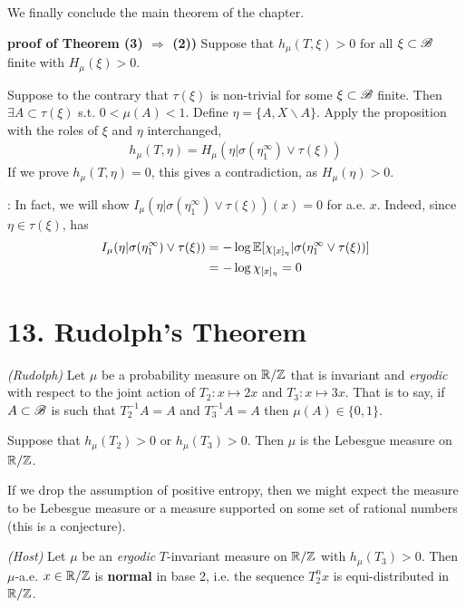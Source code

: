 \documentclass[12pt,a4paper]{report}
\newenvironment{proof}
{\begin{changemargin}{1cm}{0.5cm} 
	}%
	{\end{changemargin}
}
\newenvironment{subproof}
{\begin{changemargin}{0.5cm}{0.5cm}
	}%
	{\end{changemargin}
}
\begin{document}
We finally conclude the main theorem of the chapter.
\s

\begin{proof}
\textbf{proof of Theorem (3) $\Rightarrow$ (2))} Suppose that $h_{\mu}(T, \xi ) >0$ for all $\xi \subset \mathscr{B}$ finite with $H_{\mu}(\xi) >0$. 

\quad Suppose to the contrary that $\tau(\xi)$ is non-trivial for some $\xi \subset \mathscr{B}$ finite. Then $\exists A \subset \tau(\xi)$ s.t. $0< \mu(A) <1$. Define $\eta = \{A, X\backslash A \}$. Apply the proposition with the roles of $\xi$ and $\eta$ interchanged,
\begin{align*}
h_{\mu}(T, \eta) = H_{\mu} (\eta | \sigma(\eta_1^{\infty}) \vee \tau(\xi) ) 
\end{align*}
If we prove $h_{\mu}(T, \eta) =0$, this gives a contradiction, as $H_{\mu}(\eta) >0$.
\begin{subproof}
: In fact, we will show $I_{\mu}(\eta | \sigma(\eta_1^{\infty}) \vee \tau(\xi)) (x) =0$ for a.e. $x$. Indeed, since $\eta \in \tau(\xi)$, has
\begin{align*}
I_{\mu}(\eta | \sigma(\eta_1^{\infty}) \vee \tau(\xi)) &= -\log \mathbb{E} [\chi_{[x]_{\eta}} | \sigma(\eta_1^{\infty} \vee \tau(\xi))] \\
&= -\log \chi_{[x]_{\eta}} =0
\end{align*}
\end{subproof}
\eop
\end{proof}

\section*{13. Rudolph's Theorem}

\thm \emph{(Rudolph)} Let $\mu$ be a probability measure on $\mathbb{R}/ \mathbb{Z}$ that is invariant and \emph{ergodic} with respect to the joint action of $T_2 : x \mapsto 2x$ and $T_3 : x\mapsto 3x$. That is to say, if $A \subset \mathscr{B}$ is such that $T_2^{-1} A =A$ and $T_3^{-1} A =A$ then $\mu(A) \in \{0,1\}$. 

\quad Suppose that $h_{\mu}(T_2)>0$ or $h_{\mu}(T_3) >0$. Then $\mu$ is the Lebesgue measure on $\mathbb{R}/\mathbb{Z}$.
\s

If we drop the assumption of positive entropy, then we might expect the measure to be Lebesgue measure or a measure supported on some set of rational numbers (this is a conjecture).
\s

\thm \emph{(Host)} Let $\mu$ be an \emph{ergodic} $T$-invariant measure on $\mathbb{R}/\mathbb{Z}$ with $h_{\mu}(T_3)>0$. Then $\mu$-a.e. $x\in \mathbb{R}/\mathbb{Z}$ is \textbf{normal} in base 2, i.e. the sequence $T_2^n x$ is equi-distributed in $\mathbb{R}/ \mathbb{Z}$.
\end{document}
